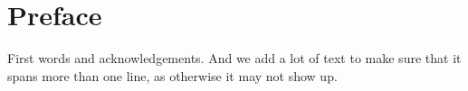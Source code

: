 \chapter*{Preface}

First words and acknowledgements. And we add a lot of text to make sure that it spans more than one line, as otherwise it may not show up.
